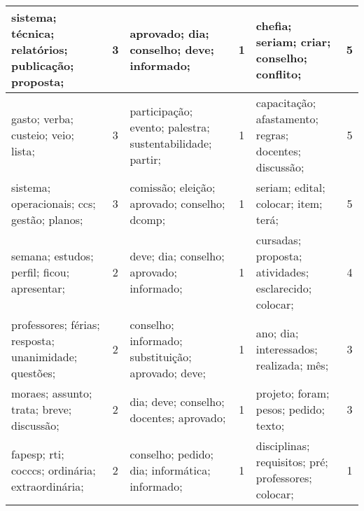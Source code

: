 \begin{table}[!h]
\begin{tabular}{|l|c||l|c||l|c|}
   sistema; técnica; relatórios; publicação; proposta;    &   3  &         aprovado; dia; conselho; deve; informado;    &   1  &       chefia; seriam; criar; conselho; conflito;    &   5  \\ \hline
   gasto; verba; custeio; veio; lista;    &   3  &         participação; evento; palestra; sustentabilidade; partir;    &   1  &       capacitação; afastamento; regras; docentes; discussão;    &   5  \\ \hline
   sistema; operacionais; ccs; gestão; planos;    &   3  &         comissão; eleição; aprovado; conselho; dcomp;    &   1  &       seriam; edital; colocar; item; terá;    &   5  \\ \hline
   semana; estudos; perfil; ficou; apresentar;    &   2  &         deve; dia; conselho; aprovado; informado;    &   1  &       cursadas; proposta; atividades; esclarecido; colocar;    &   4  \\ \hline
   professores; férias; resposta; unanimidade; questões;    &   2  &         conselho; informado; substituição; aprovado; deve;    &   1  &       ano; dia; interessados; realizada; mês;    &   3  \\ \hline
   moraes; assunto; trata; breve; discussão;    &   2  &         dia; deve; conselho; docentes; aprovado;    &   1  &       projeto; foram; pesos; pedido; texto;    &   3  \\ \hline
   fapesp; rti; cocccs; ordinária; extraordinária;    &   2  &         conselho; pedido; dia; informática; informado;    &   1  &       disciplinas; requisitos; pré; professores; colocar;    &   1  \\ \hline










	\end{tabular}
\end{table}

